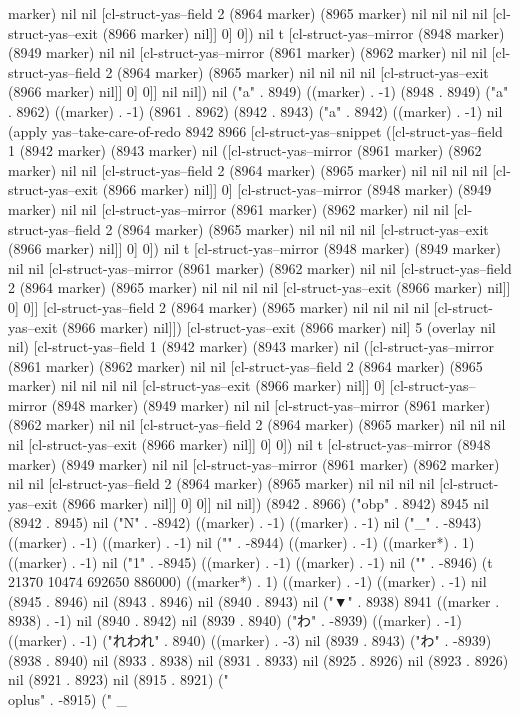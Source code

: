 marker) nil nil [cl-struct-yas--field 2 (8964 marker) (8965 marker) nil nil nil nil [cl-struct-yas--exit (8966 marker) nil]] 0] 0]) nil t [cl-struct-yas--mirror (8948 marker) (8949 marker) nil nil [cl-struct-yas--mirror (8961 marker) (8962 marker) nil nil [cl-struct-yas--field 2 (8964 marker) (8965 marker) nil nil nil nil [cl-struct-yas--exit (8966 marker) nil]] 0] 0]] nil nil]) nil ("a" . 8949) ((marker) . -1) (8948 . 8949) ("a" . 8962) ((marker) . -1) (8961 . 8962) (8942 . 8943) ("a" . 8942) ((marker) . -1) nil (apply yas--take-care-of-redo 8942 8966 [cl-struct-yas--snippet ([cl-struct-yas--field 1 (8942 marker) (8943 marker) nil ([cl-struct-yas--mirror (8961 marker) (8962 marker) nil nil [cl-struct-yas--field 2 (8964 marker) (8965 marker) nil nil nil nil [cl-struct-yas--exit (8966 marker) nil]] 0] [cl-struct-yas--mirror (8948 marker) (8949 marker) nil nil [cl-struct-yas--mirror (8961 marker) (8962 marker) nil nil [cl-struct-yas--field 2 (8964 marker) (8965 marker) nil nil nil nil [cl-struct-yas--exit (8966 marker) nil]] 0] 0]) nil t [cl-struct-yas--mirror (8948 marker) (8949 marker) nil nil [cl-struct-yas--mirror (8961 marker) (8962 marker) nil nil [cl-struct-yas--field 2 (8964 marker) (8965 marker) nil nil nil nil [cl-struct-yas--exit (8966 marker) nil]] 0] 0]] [cl-struct-yas--field 2 (8964 marker) (8965 marker) nil nil nil nil [cl-struct-yas--exit (8966 marker) nil]]) [cl-struct-yas--exit (8966 marker) nil] 5 (overlay nil nil) [cl-struct-yas--field 1 (8942 marker) (8943 marker) nil ([cl-struct-yas--mirror (8961 marker) (8962 marker) nil nil [cl-struct-yas--field 2 (8964 marker) (8965 marker) nil nil nil nil [cl-struct-yas--exit (8966 marker) nil]] 0] [cl-struct-yas--mirror (8948 marker) (8949 marker) nil nil [cl-struct-yas--mirror (8961 marker) (8962 marker) nil nil [cl-struct-yas--field 2 (8964 marker) (8965 marker) nil nil nil nil [cl-struct-yas--exit (8966 marker) nil]] 0] 0]) nil t [cl-struct-yas--mirror (8948 marker) (8949 marker) nil nil [cl-struct-yas--mirror (8961 marker) (8962 marker) nil nil [cl-struct-yas--field 2 (8964 marker) (8965 marker) nil nil nil nil [cl-struct-yas--exit (8966 marker) nil]] 0] 0]] nil nil]) (8942 . 8966) ("obp" . 8942) 8945 nil (8942 . 8945) nil ("N" . -8942) ((marker) . -1) ((marker) . -1) nil ("_" . -8943) ((marker) . -1) ((marker) . -1) nil ("{" . -8944) ((marker) . -1) ((marker*) . 1) ((marker) . -1) nil ("1" . -8945) ((marker) . -1) ((marker) . -1) nil ("}" . -8946) (t 21370 10474 692650 886000) ((marker*) . 1) ((marker) . -1) ((marker) . -1) nil (8945 . 8946) nil (8943 . 8946) nil (8940 . 8943) nil ("▼" . 8938) 8941 ((marker . 8938) . -1) nil (8940 . 8942) nil (8939 . 8940) ("わ" . -8939) ((marker) . -1) ((marker) . -1) ("れわれ" . 8940) ((marker) . -3) nil (8939 . 8943) ("わ" . -8939) (8938 . 8940) nil (8933 . 8938) nil (8931 . 8933) nil (8925 . 8926) nil (8923 . 8926) nil (8921 . 8923) nil (8915 . 8921) ("\\oplus" . -8915) (" _
